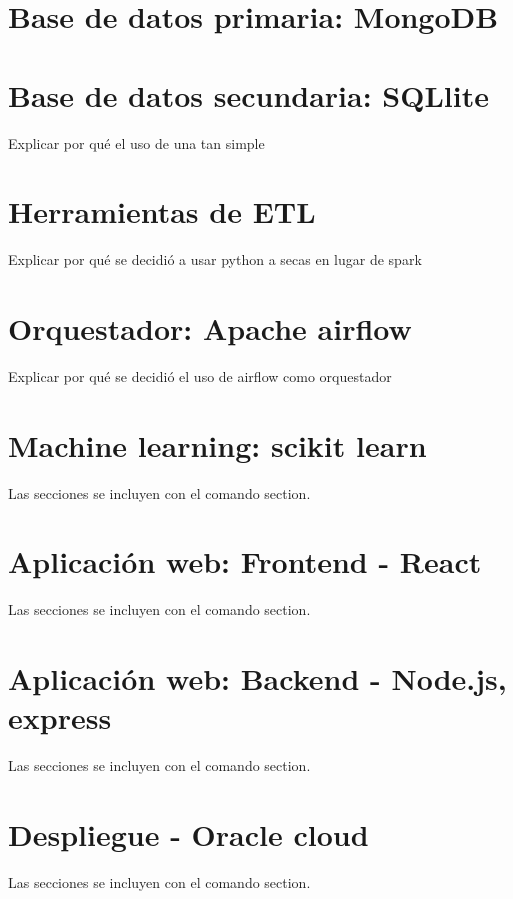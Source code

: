\section{Base de datos primaria: MongoDB}

\section{Base de datos secundaria: SQLlite}

Explicar por qué el uso de una tan simple

\section{Herramientas de ETL}

Explicar por qué se decidió a usar python a secas en lugar de spark

\section{Orquestador: Apache airflow}

Explicar por qué se decidió el uso de airflow como orquestador

\section{Machine learning: scikit learn}

Las secciones se incluyen con el comando section.

\section{Aplicación web: Frontend - React}

Las secciones se incluyen con el comando section.

\section{Aplicación web: Backend - Node.js, express}

Las secciones se incluyen con el comando section.

\section{Despliegue - Oracle cloud}

Las secciones se incluyen con el comando section.

